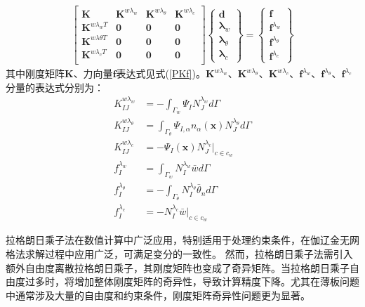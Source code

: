 \begin{equation}
    \begin{split}
     \begin{bmatrix}\pmb{K}&\pmb{K}^{w\lambda_w}&\pmb{K}^{w\lambda_\theta}&\pmb{K}^{w\lambda_c}\\
     \pmb{K}^{w\lambda_w T}&\pmb 0&\pmb 0&\pmb 0\\
     \pmb{K}^{w\lambda\theta T}&\pmb 0&\pmb 0&\pmb 0\\
     \pmb{K}^{w\lambda_c T}&\pmb 0&\pmb 0&\pmb 0\\
     \end{bmatrix}
     \left\{\begin{matrix}
     \pmb{d}\\\pmb \lambda_w\\\pmb \lambda_{\theta}\\\pmb\lambda_c
     \end{matrix}\right\}=
     \left\{\begin{matrix}
     \pmb{f}\\\pmb f^{\lambda_w}\\\pmb f^{\lambda_\theta}\\\pmb f^{\lambda_c}
     \end{matrix}\right\}
\end{split}
\end{equation}
其中刚度矩阵$\pmb{K}$、力向量$\pmb{f}$表达式见式(\ref{PKf})。$\pmb K^{w\lambda_w}$、$\pmb K^{w\lambda_\theta}$、$\pmb K^{w\lambda_c}$、$\pmb f^{\lambda_w}$、$\pmb f^{\lambda_\theta}$、$\pmb f^{\lambda_c}$分量的表达式分别为：
\begin{subequations}
\begin{align}
    K_{IJ}^{w\lambda_w}&=-\int_{\Gamma_w}\Psi_IN_J^{\lambda_w}d\Gamma\\
    K_{IJ}^{w\lambda_\theta}&=\int_{\Gamma_\theta}\Psi_{I,\alpha}n_\alpha(\pmb{x})N_J^{\lambda_\theta}d\Gamma\\
    K_{IJ}^{w\lambda_c}&=-\Psi_I(\pmb{x})N_J^{\lambda_c}\vert_{c\in c_w}\\
    f_I^{\lambda_w}&=\int_{\Gamma_w}N_I^{\lambda_w}\bar{w}d\Gamma\\
    f_I^{\lambda_\theta}&=-\int_{\Gamma_\theta}N_I^{\lambda_\theta}\bar{\theta}_nd\Gamma\\
    f_I^{\lambda_c}&=-N_I^{\lambda_c}\bar{w}\vert_{c\in c_w}
\end{align}
\end{subequations}\par
拉格朗日乘子法在数值计算中广泛应用，特别适用于处理约束条件，在伽辽金无网格法求解过程中应用广泛，可满足变分的一致性。
然而，拉格朗日乘子法需引入额外自由度离散拉格朗日乘子，其刚度矩阵也变成了奇异矩阵。当拉格朗日乘子自由度过多时，将增加整体刚度矩阵的奇异性，导致计算精度下降。尤其在薄板问题中通常涉及大量的自由度和约束条件，刚度矩阵奇异性问题更为显著。
